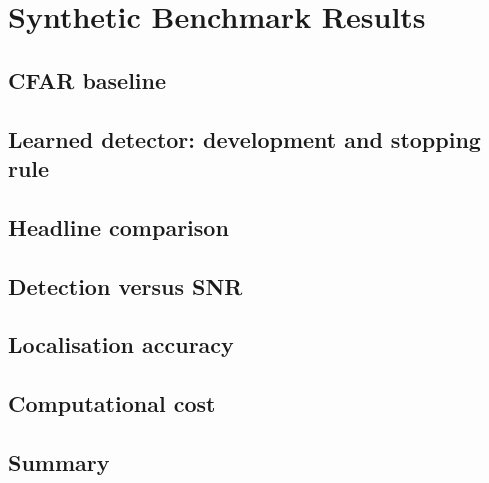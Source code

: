 \chapter{Synthetic Benchmark Results}
\label{ch:synthetic}

\section{CFAR baseline}
\section{Learned detector: development and stopping rule}
\section{Headline comparison}
\section{Detection versus SNR}
\section{Localisation accuracy}
\section{Computational cost}
\section{Summary}

